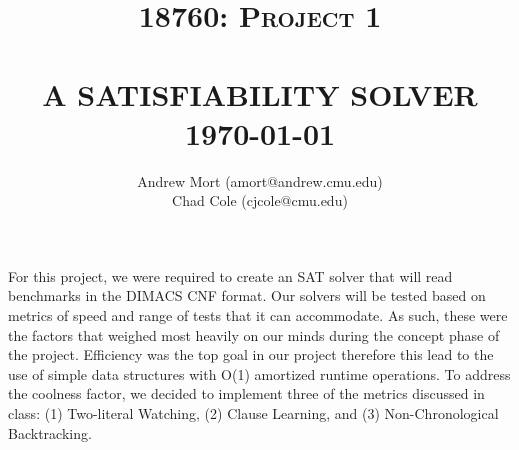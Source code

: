 \documentclass[9pt]{extarticle}
\title{ \Large \textsc{18760: Project 1}
\\[2.0cm]
\HRule{0.5pt}\\
\Huge\textbf{\uppercase{A Satisfiability Solver}}
\HRule{2pt} \\[0.5cm]
\Large \today
}
\author{
    \Large
    Andrew Mort (amort@andrew.cmu.edu)\\
    Chad Cole (cjcole@cmu.edu)\\
}
\date{} %
\makeatletter
\def\printtitle{\centering \@title\par}
\def\printauthor{\centering \large \@author}
\makeatother
\begin{document}
\thispagestyle{empty}

\printtitle
\vfill
\printauthor

\clearpage
\raggedright



\begin{homeworkProblem}[Introduction]

    For this project, we were required to create an SAT solver that will read benchmarks in the DIMACS CNF format. Our solvers will be tested based on metrics of speed and range of tests that it can accommodate. As such, these were the factors that weighed most heavily on our minds during the concept phase of the project. Efficiency was the top goal in our project therefore this lead to the use of simple data structures with O(1) amortized runtime operations. To address the coolness
    factor, we decided to implement three of the metrics discussed in class: (1) Two-literal Watching, (2) Clause Learning, and (3) Non-Chronological Backtracking.

\end{homeworkProblem}
\end{document}
